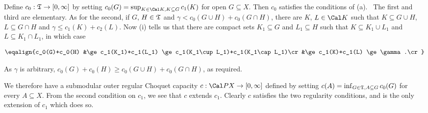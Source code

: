 {\medskip 
 
 Define $c_0:\frak T\to[0,\infty]$ by setting 
$c_0(G)=\sup_{K\in\Cal K,K\subseteq G}c_1(K)$ for open $G\subseteq X$. 
Then $c_0$ satisfies the conditions of (a).   \Prf\ The first and third are 
elementary.   As for the second, if $G$, $H\in\frak T$ and 
$\gamma<c_0(G\cup H)+c_0(G\cap H)$, there are $K$, $L\in\Cal K$ such that 
$K\subseteq G\cup H$, $L\subseteq G\cap H$ and  
$\gamma\le c_1(K)+c_2(L)$.   Now (i) tells us that there are compact sets 
$K_1\subseteq G$ and $L_1\subseteq H$ such that $K\subseteq K_1\cup L_1$ 
and $L\subseteq K_1\cap L_1$, in which case 
 
$$\eqalign{c_0(G)+c_0(H) 
&\ge c_1(K_1)+c_1(L_1) 
\ge c_1(K_1\cup L_1)+c_1(K_1\cap L_1)\cr 
&\ge c_1(K)+c_1(L) 
\ge\gamma.\cr}$$ 
 
\noindent As $\gamma$ is arbitrary, 
$c_0(G)+c_0(H)\ge c_0(G\cup H)+c_0(G\cap H)$, as required.\ \Qed 
 
\medskip 
 
 We therefore have a submodular outer regular 
Choquet capacity $c:\Cal PX\to[0,\infty]$ 
defined by setting $c(A)=\inf_{G\in\frak T,A\subseteq G}c_0(G)$ for every 
$A\subseteq X$.   From the second condition on $c_1$, we see that $c$ 
extends $c_1$.   Clearly $c$ satisfies the two regularity conditions, and 
is the only extension of $c_1$ which does so.    
}%
      
